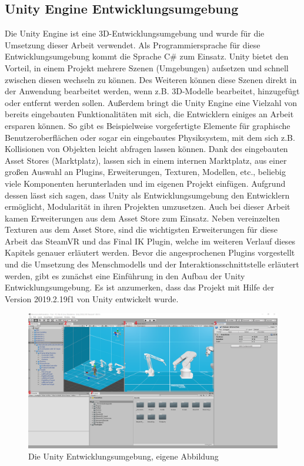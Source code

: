 \subsection{Unity Engine Entwicklungsumgebung}\label{sec:UnitEngine}
Die Unity Engine ist eine 3D-Entwicklungsumgebung und wurde für die Umsetzung dieser Arbeit verwendet. Als Programmiersprache für diese Entwicklungsumgebung kommt die Sprache C\# zum Einsatz. Unity bietet den Vorteil, in einem Projekt mehrere Szenen (Umgebungen) aufsetzen und schnell zwischen diesen wechseln zu können. Des Weiteren können diese Szenen direkt in der Anwendung bearbeitet werden, wenn z.B. 3D-Modelle bearbeitet, hinzugefügt oder entfernt werden sollen. Außerdem bringt die Unity Engine eine Vielzahl von bereits eingebauten Funktionalitäten mit sich, die Entwicklern einiges an Arbeit ersparen können. So gibt es Beispielweise vorgefertigte Elemente für graphische Benutzeroberflächen oder sogar ein eingebautes Physiksystem, mit dem sich z.B. Kollisionen von Objekten leicht abfragen lassen können. Dank des eingebauten Asset Stores (Marktplatz), lassen sich in einem internen Marktplatz, aus einer großen Auswahl an Plugins, Erweiterungen, Texturen, Modellen, etc., beliebig viele Komponenten herunterladen und im eigenen Projekt einfügen. Aufgrund dessen lässt sich sagen, dass Unity als Entwicklungsumgebung den Entwicklern ermöglicht, Modularität in ihren Projekten umzusetzen.
Auch bei dieser Arbeit kamen Erweiterungen aus dem Asset Store zum Einsatz. Neben vereinzelten Texturen aus dem Asset Store, sind die wichtigsten Erweiterungen für diese Arbeit das SteamVR und das Final IK Plugin, welche im weiteren Verlauf dieses Kapitels genauer erläutert werden.
\newline\newline
Bevor die angesprochenen Plugins vorgestellt und die Umsetzung des Menschmodells und der Interaktionsschnittstelle erläutert werden, gibt es zunächst eine Einführung in den Aufbau der Unity Entwicklungsumgebung. Es ist anzumerken, dass das Projekt mit Hilfe der Version 2019.2.19f1 von Unity entwickelt wurde.
\begin{figure}[h]
	\centering
	\includegraphics[width=1\linewidth]{Bilder/A47_UnityOverview2}
	\caption{Die Unity Entwicklungsumgebung, eigene Abbildung}
	\label{fig:UnityOverview}
\end{figure}
